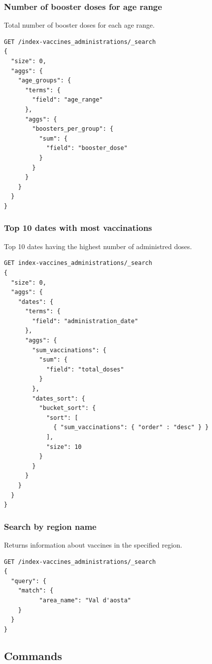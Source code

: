 \documentclass[12pt, a4paper]{article}
\begin{document}
\subsubsection{Number of booster doses for age range}
Total number of booster doses for each age range.
\begin{tcolorbox}[fontupper=\scriptsize]
  \begin{verbatim}
GET /index-vaccines_administrations/_search
{
  "size": 0,
  "aggs": {
    "age_groups": {
      "terms": { 
        "field": "age_range" 
      },
      "aggs": {
        "boosters_per_group": {
          "sum": {
            "field": "booster_dose"
          }
        }
      }
    }
  }
}
  \end{verbatim}
\end{tcolorbox}

\subsubsection{Top 10 dates with most vaccinations}
Top 10 dates having the highest number of administred doses.
\begin{tcolorbox}[fontupper=\scriptsize]
  \begin{verbatim}
GET index-vaccines_administrations/_search
{
  "size": 0,
  "aggs": {
    "dates": {
      "terms": { 
        "field": "administration_date" 
      },
      "aggs": {
        "sum_vaccinations": {
          "sum": {
            "field": "total_doses"
          }
        },
        "dates_sort": {
          "bucket_sort": {
            "sort": [
              { "sum_vaccinations": { "order" : "desc" } }
            ],
            "size": 10
          }
        }
      }
    }
  }
}
  \end{verbatim}
\end{tcolorbox}

\subsubsection{Search by region name}
Returns information about vaccines in the specified region.
\begin{tcolorbox}[fontupper=\scriptsize]
  \begin{verbatim}
GET /index-vaccines_administrations/_search
{
  "query": {
    "match": {
          "area_name": "Val d'aosta"
    }
  }
}
  \end{verbatim}
\end{tcolorbox}

\subsection{Commands}
\end{document}
